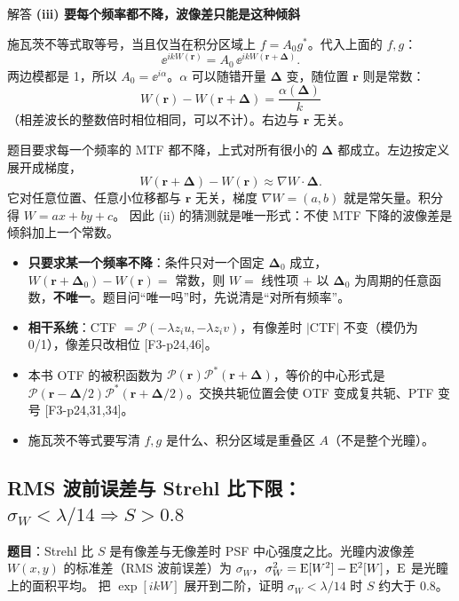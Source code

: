 \begin{exam}{解答}
\textbf{(iii) 要每个频率都不降，波像差只能是这种倾斜}

施瓦茨不等式取等号，当且仅当在积分区域上 $f=A_0 g^*$。代入上面的 $f,g$：
\[
\ee^{ikW(\bm r)}=A_0\,\ee^{ikW(\bm r+\bm\Delta)} .
\]
两边模都是 1，所以 $A_0=\ee^{i\alpha}$。$\alpha$ 可以随错开量 $\bm\Delta$ 变，随位置 $\bm r$ 则是常数：
\[
W(\bm r)-W(\bm r+\bm\Delta)=\frac{\alpha(\bm\Delta)}{k}
\]
（相差波长的整数倍时相位相同，可以不计）。右边与 $\bm r$ 无关。

题目要求每一个频率的 MTF 都不降，上式对所有很小的 $\bm\Delta$ 都成立。左边按定义展开成梯度，
\[
W(\bm r+\bm\Delta)-W(\bm r)\approx\nabla W\cdot\bm\Delta .
\]
它对任意位置、任意小位移都与 $\bm r$ 无关，梯度 $\nabla W=(a,b)$ 就是常矢量。积分得 $W=ax+by+c$。
因此 (ii) 的猜测就是唯一形式：不使 MTF 下降的波像差是倾斜加上一个常数。
\end{exam}

\begin{warn}[变式与易错]
\begin{itemize}
\item \textbf{只要求某一个频率不降}：条件只对一个固定 $\bm\Delta_0$ 成立，$W(\bm r+\bm\Delta_0)-W(\bm r)=$ 常数，则 $W=$ 线性项 $+$ 以 $\bm\Delta_0$ 为周期的任意函数，\textbf{不唯一}。题目问“唯一吗”时，先说清是“对所有频率”。
\item \textbf{相干系统}：CTF $=\mathcal P(-\lambda z_iu,-\lambda z_iv)$，有像差时 $|\mathrm{CTF}|$ 不变（模仍为 0/1），像差只改相位 [F3-p24,46]。
\item 本书 OTF 的被积函数为 $\mathcal P(\bm r)\mathcal P^*(\bm r+\bm\Delta)$，等价的中心形式是 $\mathcal P(\bm r-\bm\Delta/2)\mathcal P^*(\bm r+\bm\Delta/2)$。交换共轭位置会使 OTF 变成复共轭、PTF 变号 [F3-p24,31,34]。
\item 施瓦茨不等式要写清 $f,g$ 是什么、积分区域是重叠区 $A$（不是整个光瞳）。
\end{itemize}
\end{warn}

\subsection{RMS 波前误差与 Strehl 比下限：$\sigma_W<\lambda/14\Rightarrow S>0.8$}\label{ex:v-strehl}
\noindent\textbf{题目}：Strehl 比 $S$ 是有像差与无像差时 PSF 中心强度之比。光瞳内波像差 $W(x,y)$ 的标准差（RMS 波前误差）为 $\sigma_W$，$\sigma_W^2=\mathrm{E}[W^2]-\mathrm{E}^2[W]$，$\mathrm{E}$ 是光瞳上的面积平均。
把 $\exp[ikW]$ 展开到二阶，证明 $\sigma_W<\lambda/14$ 时 $S$ 约大于 $0.8$。

